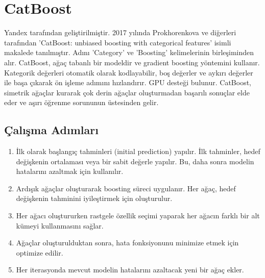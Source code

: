 \section{CatBoost}
Yandex tarafından geliştirilmiştir. 2017 yılında Prokhorenkova ve diğerleri tarafından 'CatBoost: unbiased boosting with categorical features' isimli makalede tanılmıştır. Adını 'Category' ve 'Boosting' kelimelerinin birleşiminden alır. CatBoost, ağaç tabanlı bir modeldir ve gradient boosting yöntemini kullanır. Kategorik değerleri otomatik olarak kodlayabilir, boş değerler ve aykırı değerler ile başa çıkarak ön işleme adımını hızlandırır. GPU desteği bulunur. CatBoost, simetrik ağaçlar kurarak çok derin ağaçlar oluşturmadan başarılı sonuçlar elde eder ve aşırı öğrenme sorununun üstesinden gelir.

\subsection{Çalışma Adımları}
\begin{enumerate}
	\item İlk olarak başlangıç tahminleri (initial prediction) yapılır. İlk tahminler, hedef değişkenin ortalaması veya bir sabit değerle yapılır.  Bu, daha sonra modelin hatalarını azaltmak için kullanılır.
	\item Ardışık ağaçlar oluşturarak boosting süreci uygulanır. Her ağaç, hedef değişkenin tahminini iyileştirmek için oluşturulur.
	\item Her ağacı oluştururken rastgele özellik seçimi yaparak her ağacın farklı bir alt kümeyi kullanmasını sağlar.
	\item Ağaçlar oluşturulduktan sonra, hata fonksiyonunu minimize etmek için optimize edilir.
	\item Her iterasyonda mevcut modelin hatalarını azaltacak yeni bir ağaç ekler.
\end{enumerate}

